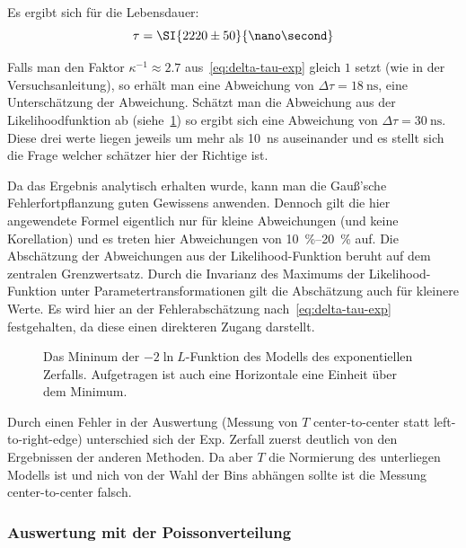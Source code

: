 \documentclass[slug=LM, room=Andreas-Schubert-Bau\,\ K\ 1A, supervisor=Anne-Sophie\ Berthold, coursedate=13.\ 12.\ 2019]{../../Lab_Report_LaTeX/lab_report}
\begin{document}
Es ergibt sich f\"ur die Lebensdauer:
\begin{equation}
  \label{eq:result-exponential}
  \tau = \SI{2220\pm 50}{\nano\second}
\end{equation}

Falls man den Faktor \(\kappa^{-1} \approx 2.7\)
aus~\ref{eq:delta-tau-exp} gleich \(1\) setzt (wie in der
Versuchsanleitung), so erh\"alt man eine Abweichung von
\(\Delta\tau = \SI{18}{\nano\second}\), eine Untersch\"atzung der
Abweichung. Sch\"atzt man die Abweichung aus der Likelihoodfunktion ab
(siehe~\ref{fig:haupt-exp}) so ergibt sich eine Abweichung von
\(\Delta\tau = \SI{30}{\nano\second}\). Diese drei werte liegen
jeweils um mehr als \SI{10}{\nano\second} auseinander und es stellt
sich die Frage welcher sch\"atzer hier der Richtige ist.

Da das Ergebnis analytisch erhalten wurde, kann man die Gauß'sche
Fehlerfortpflanzung guten Gewissens anwenden. Dennoch gilt die hier
angewendete Formel eigentlich nur f\"ur kleine Abweichungen (und keine
Korellation) und es treten hier Abweichungen von
\SIrange{10}{20}{\percent} auf. Die Absch\"atzung der Abweichungen aus
der Likelihood-Funktion beruht auf dem zentralen Grenzwertsatz. Durch
die Invarianz des Maximums der Likelihood-Funktion unter
Parametertransformationen gilt die Absch\"atzung auch f\"ur kleinere
Werte. Es wird hier an der Fehlerabsch\"atzung
nach~\ref{eq:delta-tau-exp} festgehalten, da diese einen direkteren
Zugang darstellt.


\begin{figure}[h]\centering
  
  \caption{Das Mininum der \(-2\ln{L}\)-Funktion des Modells des
    exponentiellen Zerfalls. Aufgetragen ist auch eine Horizontale
    eine Einheit \"uber dem Minimum.}
  \label{fig:haupt-exp}
\end{figure}

\begin{itshape}
  Durch einen Fehler in der Auswertung (Messung von \(T\)
  center-to-center statt left-to-right-edge) unterschied sich der
  Exp. Zerfall zuerst deutlich von den Ergebnissen der anderen
  Methoden. Da aber \(T\) die Normierung des unterliegen Modells ist
  und nich von der Wahl der Bins abh\"angen sollte ist die Messung
  center-to-center falsch.
\end{itshape}


\subsubsection{Auswertung mit der Poissonverteilung}
\label{sec:auw-poisson}
\end{document}
